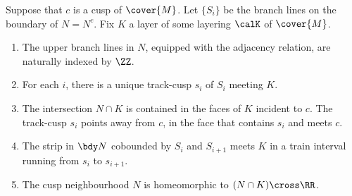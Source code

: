 \documentclass[12pt]{amsart}
\begin{document}
\begin{lemma}
\label{Lem:BranchLines}
Suppose that $c$ is a cusp of $\cover{M}$.  Let $\{S_i\}$ be the branch lines on the boundary of $N = N^c$.  Fix $K$ a layer of some layering $\calK$ of $\cover{M}$. 
\begin{enumerate}
\item
\label{Itm:Cyclic}
The upper branch lines in $N$, equipped with the adjacency relation, are naturally indexed by $\ZZ$.  
\item
\label{Itm:BranchLinesLayer}
For each $i$, there is a unique track-cusp $s_i$ of $S_i$ meeting $K$.
\item
\label{Itm:NeighbourhoodLayer}
The intersection $N \cap K$ is contained in the faces of $K$ incident to $c$. The track-cusp $s_i$ points away from $c$, in the face that contains $s_i$ and meets $c$. 
\item
\label{Itm:BranchStrip}
The strip in $\bdy N$ cobounded by $S_i$ and $S_{i+1}$ meets $K$ in a train interval running from $s_i$ to $s_{i+1}$.
\item
\label{Itm:CuspNeighbourhood}
The cusp neighbourhood $N$ is homeomorphic to $(N \cap K) \cross \RR$.

\end{enumerate}
\end{lemma}
\end{document}
